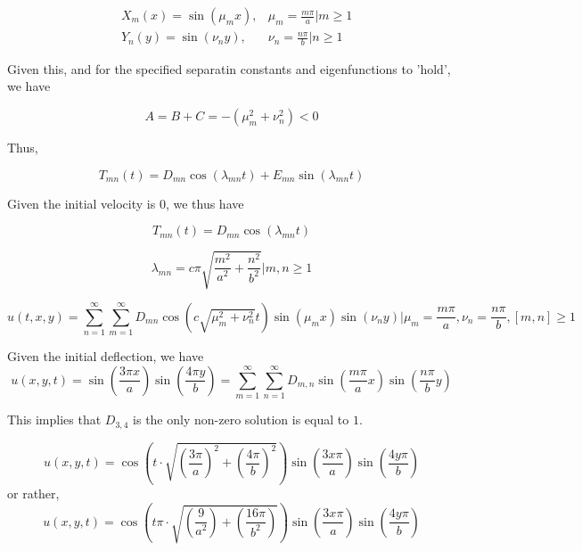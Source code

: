 \documentclass{article}
\begin{document}
\begin{align*}
&X_m(x) = \sin\left( \mu_mx\right), & \mu_m = \frac{m\pi}{a}\Bigr| m \geq 1\\
&Y_n(y) = \sin\left( \nu_ny\right), & \nu_n = \frac{n\pi}{b}\Bigr| n \geq 1
\end{align*}

Given this, and for the specified separatin constants and eigenfunctions to 'hold', we have

$$A=B+C=-(\mu_m^2+\nu_n^2) <0$$

Thus,

$$T_{mn}(t)=D_{mn}\cos\left(\lambda_{mn}t\right)+E_{mn}\sin\left(\lambda_{mn}t\right)$$

Given the initial velocity is 0, we thus have

$$T_{mn}(t)=D_{mn}\cos\left(\lambda_{mn}t\right)$$

$$\lambda_{mn}=c \pi \sqrt{\frac{m^2}{a^2}+\frac{n^2}{b^2}}\Bigr| m,n \geq 1$$

$$u(t,x,y) = \sum_{n=1}^{\infty} \sum_{m=1}^{\infty} D_{mn}\cos\left(c\sqrt{\mu_m^2 + \nu_n^2}t\right) \sin\left( \mu_mx\right) \sin\left( \nu_ny\right)\Bigr|\mu_m = \frac{m\pi}{a}, \nu_n = \frac{n \pi}{b}, [m,n]\geq 1$$


Given the initial deflection, we have
$$u(x,y,t) = \sin\left(\frac{3\pi x}{a}\right)\sin\left(\frac{4\pi y}{b}\right) = \sum_{m=1}^{\infty} \sum_{n=1}^{\infty} D_{m,n}\sin\left( \frac{m\pi}{a} x\right) \sin\left( \frac{n \pi}{b} y\right)$$

This implies that $D_{3,4}$ is the only non-zero solution is equal to $1$.

$$u(x,y,t) = \cos\left(t \cdot \sqrt{ \left(\frac{3 \pi}{a}\right)^2 + \left(\frac{4 \pi}{b}\right)^2}\right)\sin\left(\frac{3x\pi}{a}\right)\sin\left(\frac{4y\pi}{b}\right)$$
or rather,
$$u(x,y,t) = \cos\left(t \pi \cdot \sqrt{ \left(\frac{9}{a^2}\right) + \left(\frac{16 \pi}{b^2}\right)}\right)\sin\left(\frac{3x\pi}{a}\right)\sin\left(\frac{4y\pi}{b}\right)$$
\end{document}

